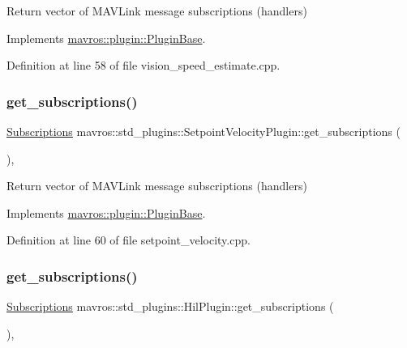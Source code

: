 Return vector of M\+A\+V\+Link message subscriptions (handlers) 



Implements \mbox{\hyperlink{group__plugin_gaf4e23fec6d7436a62cbf0942a2e5791c}{mavros\+::plugin\+::\+Plugin\+Base}}.



Definition at line 58 of file vision\+\_\+speed\+\_\+estimate.\+cpp.

\mbox{\label{group__plugin_ga63aa4be791ca2a5877ac7a1a6f4e881e}} 
\subsubsection{\texorpdfstring{get\_subscriptions()}{get\_subscriptions()}\hspace{0.1cm}{\footnotesize\ttfamily [21/41]}}
{\footnotesize\ttfamily \mbox{\hyperlink{group__plugin_ga8967d61fc77040e0c3ea5a4585d62a09}{Subscriptions}} mavros\+::std\+\_\+plugins\+::\+Setpoint\+Velocity\+Plugin\+::get\+\_\+subscriptions (\begin{DoxyParamCaption}{ }\end{DoxyParamCaption})\hspace{0.3cm}{\ttfamily [inline]}, {\ttfamily [virtual]}}



Return vector of M\+A\+V\+Link message subscriptions (handlers) 



Implements \mbox{\hyperlink{group__plugin_gaf4e23fec6d7436a62cbf0942a2e5791c}{mavros\+::plugin\+::\+Plugin\+Base}}.



Definition at line 60 of file setpoint\+\_\+velocity.\+cpp.

\mbox{\label{group__plugin_ga393b7527b376fb0e4706ac4f3d9298a3}} 
\subsubsection{\texorpdfstring{get\_subscriptions()}{get\_subscriptions()}\hspace{0.1cm}{\footnotesize\ttfamily [22/41]}}
{\footnotesize\ttfamily \mbox{\hyperlink{group__plugin_ga8967d61fc77040e0c3ea5a4585d62a09}{Subscriptions}} mavros\+::std\+\_\+plugins\+::\+Hil\+Plugin\+::get\+\_\+subscriptions (\begin{DoxyParamCaption}{ }\end{DoxyParamCaption})\hspace{0.3cm}{\ttfamily [inline]}, {\ttfamily [virtual]}}



